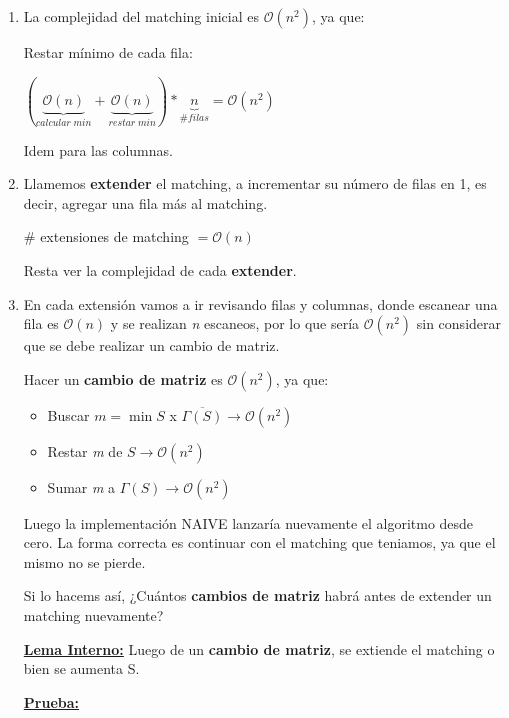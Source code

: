 \documentclass[12pt,a4paper]{report}
\begin{document}
			\begin{enumerate}
				\item La complejidad del matching inicial es $\mathcal{O}(n^{2})$, ya que:
				
					Restar mínimo de cada fila:
					\begin{center}
						$(\underbrace{\mathcal{O}(n)}_{calcular \; min} + \underbrace{\mathcal{O}(n)}_{restar \; min}) * \underbrace{n}_{\# filas} = \mathcal{O}(n^{2})$
					\end{center}
				
				Idem para las columnas.
				
				\item Llamemos \textbf{extender} el matching, a incrementar su número de filas en 1, es decir, agregar una fila más al matching.
				\begin{center}
					$\#$ extensiones de matching $= \mathcal{O}(n)$
				\end{center}
				
				Resta ver la complejidad de cada \textbf{extender}.
				
				\item En cada extensión vamos a ir revisando filas y columnas, donde escanear una fila es $\mathcal{O}(n)$ y se realizan \textit{n} escaneos, por lo que sería $\mathcal{O}(n^{2})$ sin considerar que se debe realizar un cambio de matriz.
				
				Hacer un \textbf{cambio de matriz} es $\mathcal{O}(n^{2})$, ya que:				
				\begin{itemize}
					\item Buscar $\textit{m} = \min S$ x $\overline{\Gamma(S)} \rightarrow \mathcal{O}(n^{2})$
					\item Restar \textit{m} de $S \rightarrow \mathcal{O}(n^{2})$
					\item Sumar \textit{m} a $\Gamma(S) \rightarrow \mathcal{O}(n^{2})$
				\end{itemize}
				
				Luego la implementación NAIVE lanzaría nuevamente el algoritmo desde cero. La forma correcta es continuar con el matching que teniamos, ya que el mismo no se pierde.
				
				Si lo hacems así, ¿Cuántos \textbf{cambios de matriz} habrá antes de extender un matching nuevamente?
				
				\underline{\textbf{Lema Interno:}} Luego de un \textbf{cambio de matriz}, se extiende el matching o bien se aumenta S.
				
				\underline{\textbf{Prueba:}} 			
				

\end{enumerate}
\end{document}
